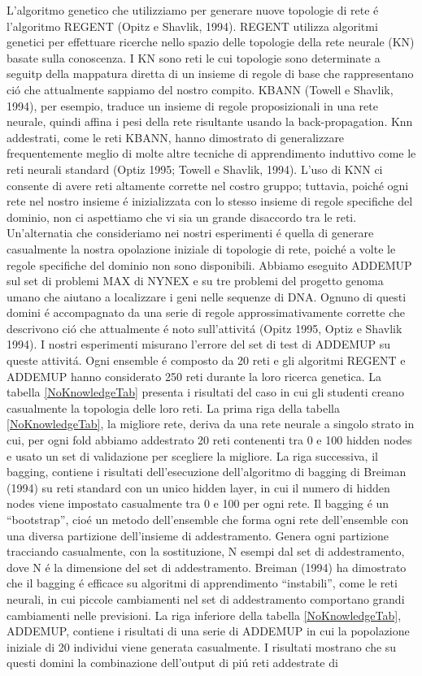 \documentclass[a4paper,10pt]{article}
\begin{document}
  L'algoritmo genetico che utilizziamo per generare nuove topologie di rete \'e l'algoritmo REGENT (Opitz e Shavlik, 1994). REGENT utilizza algoritmi genetici per effettuare ricerche nello spazio delle topologie della rete neurale (KN) basate sulla conoscenza. I KN sono reti le cui topologie sono determinate a seguitp della mappatura diretta di un insieme di regole di base che rappresentano ci\'o che attualmente sappiamo del nostro compito. KBANN (Towell e Shavlik, 1994), per esempio, traduce un insieme di regole proposizionali in una rete neurale, quindi affina i pesi della rete risultante usando la back-propagation. Knn addestrati, come le reti KBANN, hanno dimostrato di generalizzare frequentemente meglio di molte altre tecniche di apprendimento induttivo come le reti neurali standard (Optiz 1995; Towell e Shavlik, 1994). L'uso di KNN ci consente di avere reti altamente corrette nel costro gruppo; tuttavia, poich\'e ogni rete nel nostro insieme \'e inizializzata con lo stesso insieme di regole specifiche del dominio, non ci aspettiamo che vi sia un grande disaccordo tra le reti. Un'alternatia che consideriamo nei nostri esperimenti \'e quella di generare casualmente la nostra opolazione iniziale di topologie di rete, poich\'e a volte le regole specifiche del dominio non sono disponibili. Abbiamo eseguito ADDEMUP sul set di problemi MAX di NYNEX e su tre problemi del progetto genoma umano che aiutano a localizzare i geni nelle sequenze di DNA. Ognuno di questi domini \'e accompagnato da una serie di regole approssimativamente corrette che descrivono ci\'o che attualmente \'e noto sull'attivit\'a (Opitz 1995, Optiz e Shavlik 1994). I nostri esperimenti misurano l'errore del set di test di ADDEMUP su queste attivit\'a. Ogni ensemble \'e composto da 20 reti e gli algoritmi REGENT e ADDEMUP hanno considerato 250 reti durante la loro ricerca genetica. La tabella \ref{NoKnowledgeTab} presenta i risultati del caso in cui gli studenti creano casualmente la topologia delle loro reti. La prima riga della tabella \ref{NoKnowledgeTab}, la migliore rete, deriva da una rete neurale a singolo strato in cui, per ogni fold abbiamo addestrato 20 reti contenenti  tra 0 e 100 hidden nodes e usato un set di validazione per scegliere la migliore. La riga successiva, il bagging, contiene i risultati dell'esecuzione dell'algoritmo di bagging di Breiman (1994) su reti standard con un unico hidden layer, in cui il numero di hidden nodes viene impostato casualmente tra 0 e 100 per ogni rete. Il bagging \'e un ``bootstrap'', cio\'e un metodo dell'ensemble che forma ogni rete dell'ensemble con una diversa partizione dell'insieme di addestramento. Genera ogni partizione tracciando casualmente, con la sostituzione, N esempi dal set di addestramento, dove N \'e la dimensione del set di addestramento. Breiman (1994) ha dimostrato che il bagging \'e efficace su algoritmi di apprendimento ``instabili'', come le reti neurali, in cui piccole cambiamenti nel set di addestramento comportano grandi cambiamenti nelle previsioni. La riga inferiore della tabella \ref{NoKnowledgeTab}, ADDEMUP, contiene i risultati di una serie di ADDEMUP in cui la popolazione iniziale di 20 individui viene generata casualmente. I risultati mostrano che su questi domini la combinazione dell'output di pi\'u reti addestrate di 
\end{document}
